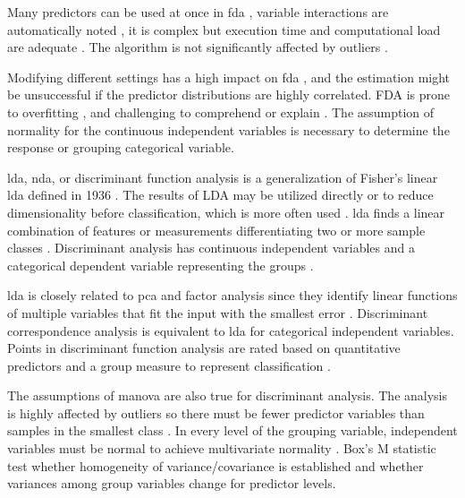 \documentclass[sn-mathphys-num]{sn-jnl}%
\begin{document}
Many predictors can be used at once in \acrshort{fda} \cite{HastieTibshirani2009}, variable interactions are automatically noted \cite{hastie1994flexible}, it is complex but execution time and computational load are adequate \cite{reynes2006choice}. The algorithm is not significantly affected by outliers \cite{phillips2017applying}.

Modifying different settings has a high impact on \acrshort{fda} \cite{hallgren2019species}, and the estimation might be unsuccessful if the predictor distributions are highly correlated. FDA is prone to overfitting \cite{thuiller2016ensemble}, and challenging to comprehend or explain \cite{quillfeldt2017influence}. The assumption of normality for the continuous independent variables is necessary \cite{zhang2019using} to determine the response or grouping categorical variable. 

\acrshort{lda}, \acrfull{nda}, or discriminant function analysis is a generalization of Fisher's linear \acrshort{lda} defined in 1936 \cite{cohen2013applied}. The results of LDA may be utilized directly or to reduce dimensionality before classification, which is more often used \cite{hansen2005using}. \acrshort{lda} finds a linear combination of features or measurements differentiating two or more sample classes \cite{fisher1936use, mclachlan2005discriminant}. Discriminant analysis has continuous independent variables and a categorical dependent variable representing the groups \cite{wetcher2011analyzing}.

\acrshort{lda} is closely related to \acrshort{pca} and factor analysis since they identify linear functions of multiple variables that fit the input with the smallest error \cite{martinez2001pca}. Discriminant correspondence analysis \cite{abdi2007discriminant, perriere2003use} is equivalent to \acrshort{lda} for categorical independent variables. Points in discriminant function analysis are rated based on quantitative predictors and a group measure \cite{cokluk2008discriminant} to represent classification \cite{venables2013modern}.

The assumptions of \acrfull{manova} are also true for discriminant analysis. The analysis is highly affected by outliers so there must be fewer predictor variables than samples in the smallest class \cite{cokluk2008discriminant}. In every level of the grouping variable, independent variables must be normal to achieve multivariate normality \cite{cokluk2008discriminant, hansen2005using}. Box's M statistic \cite{hansen2005using} test whether homogeneity of variance/covariance is established and whether variances among group variables change for predictor levels. 
\end{document}
